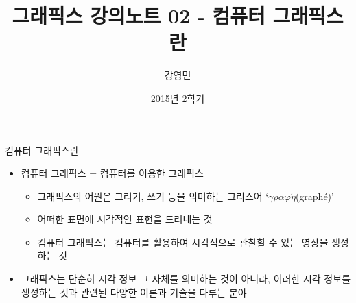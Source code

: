\documentclass{beamer}
\title[3D 그래픽스 프로그래밍]{그래픽스 강의노트 02 - 컴퓨터 그래픽스란}
\author{강영민}
\institute{동명대학교}
\date{2015년 2학기}
\begin{document}
\begin{frame}
  \titlepage
\end{frame}




\begin{frame}{컴퓨터 그래픽스란}
\begin{itemize}
\item 컴퓨터 그래픽스 = 컴퓨터를 이용한 그래픽스
	\begin{itemize}
	\item 그래픽스의 어원은 그리기, 쓰기 등을 의미하는 그리스어  ‘$\gamma\rho\alpha\varphi\acute{\eta}$(graph\'{e})’
	\item 어떠한 표면에 시각적인 표현을 드러내는 것
	\item 컴퓨터 그래픽스는 컴퓨터를 활용하여 시각적으로 관찰할 수 있는 영상을 생성하는 것
	\end{itemize}
\item 그래픽스는 단순히 시각 정보 그 자체를 의미하는 것이 아니라, 이러한 시각 정보를 생성하는 것과 관련된 다양한 이론과 기술을 다루는 분야
\end{itemize}
\end{frame}
\end{document}
